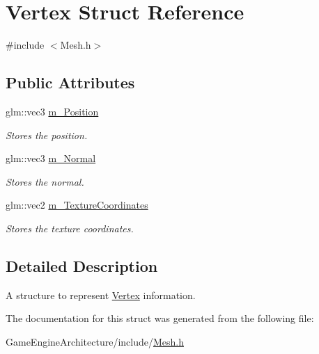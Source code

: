 \hypertarget{struct_vertex}{}\section{Vertex Struct Reference}
\label{struct_vertex}


{\ttfamily \#include $<$Mesh.\+h$>$}

\subsection*{Public Attributes}
\begin{DoxyCompactItemize}
\item 
\mbox{\label{struct_vertex_a536a2db436f8e20888689a5c4d12563f}} 
glm\+::vec3 \mbox{\hyperlink{struct_vertex_a536a2db436f8e20888689a5c4d12563f}{m\+\_\+\+Position}}
\begin{DoxyCompactList}\small\item\em Stores the position. \end{DoxyCompactList}\item 
\mbox{\label{struct_vertex_a8563cf4d90f76557892b921e256231a5}} 
glm\+::vec3 \mbox{\hyperlink{struct_vertex_a8563cf4d90f76557892b921e256231a5}{m\+\_\+\+Normal}}
\begin{DoxyCompactList}\small\item\em Stores the normal. \end{DoxyCompactList}\item 
\mbox{\label{struct_vertex_afee3b57168a20f82381060365978ce22}} 
glm\+::vec2 \mbox{\hyperlink{struct_vertex_afee3b57168a20f82381060365978ce22}{m\+\_\+\+Texture\+Coordinates}}
\begin{DoxyCompactList}\small\item\em Stores the texture coordinates. \end{DoxyCompactList}\end{DoxyCompactItemize}


\subsection{Detailed Description}
A structure to represent \mbox{\hyperlink{struct_vertex}{Vertex}} information. 

The documentation for this struct was generated from the following file\+:\begin{DoxyCompactItemize}
\item 
Game\+Engine\+Architecture/include/\mbox{\hyperlink{_mesh_8h}{Mesh.\+h}}\end{DoxyCompactItemize}
